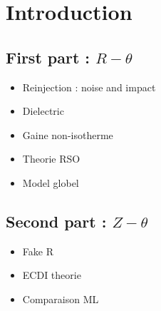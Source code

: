
\chapter{Introduction}



\section{First part : $R-\theta$}

\begin{itemize}
  \item Reinjection : noise and impact
  \item Dielectric
  \item Gaine non-isotherme
  \item Theorie RSO
  \item Model globel
\end{itemize}

\section{Second part : $Z-\theta$}

\begin{itemize}
  \item Fake R
  \item ECDI theorie
  \item Comparaison ML
\end{itemize}
